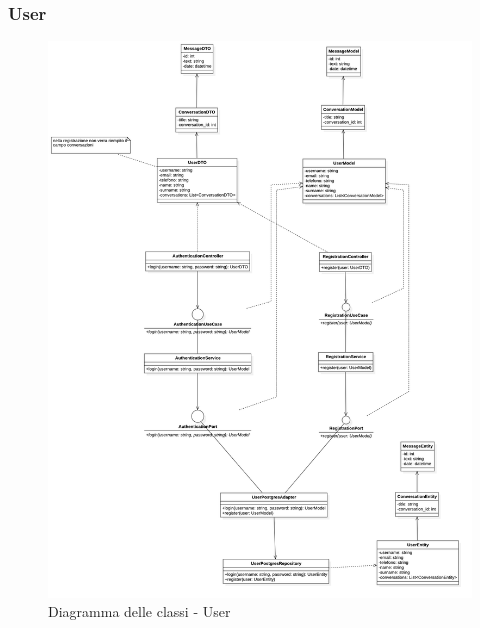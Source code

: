 \subsubsection{User}
\begin{figure}[H]
    \centering
    \includegraphics[width=\linewidth, height=0.8\textheight, keepaspectratio]{./img/User.png}
    \caption{Diagramma delle classi - User}
    \label{fig:user}
\end{figure}


